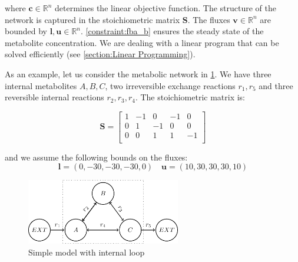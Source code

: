 
where $\mathbf c \in \mathbb{R}^n$ determines the linear objective function. The structure of the network is captured in the stoichiometric matrix $\mathbf S$. The fluxes $\mathbf v \in \mathbb{R}^n$ are bounded by $\mathbf l, \mathbf u \in \mathbb{R}^n$. \cref{constraint:fba_b} ensures the steady state of the metabolite concentration. We are dealing with a linear program that can be solved efficiently (see \cref{section:Linear Programming}).

As an example, let us consider the metabolic network in \cref{fig:loop}. We have three internal metabolites $A,B,C$, two irreversible exchange reactions $r_1, r_5$ and three reversible internal reactions $r_2, r_3, r_4$. The stoichiometric matrix is: 

\begin{equation} \label{Eq:S_loop}
    \mathbf S =
    \left[\begin{array}{ccccc}
        1 & -1 & 0 & -1 & 0 \\
        0 & 1 & -1 & 0 & 0 \\
        0 & 0 & 1 & 1 & -1 \\
    \end{array}\right]        
\end{equation}

 and we assume the following bounds on the fluxes: 
\begin{equation} \label{Eq:bounds_loop}
    \mathbf l = (0,-30,-30,-30,0) \quad \mathbf u = (10,30,30,30,10)
\end{equation}

\begin{figure}[h!]
    \centering
    \includegraphics[width=0.6\textwidth]{Images/tikz_graphs_one_loop.pdf}
    \caption{Simple model with internal loop}
    \label{fig:loop}
\end{figure}

